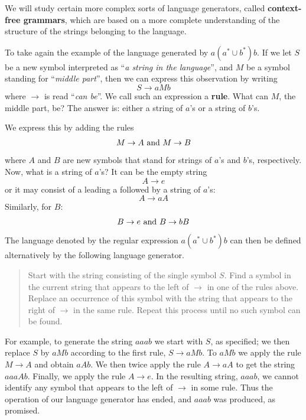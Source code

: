 \begin{multicols*}{2}
We will study certain more complex sorts of language generators, called \textbf{context-free grammars}, which are based on a more complete understanding of the structure of the strings belonging to the language.


To take again the example of the language generated by $a(a^* \cup b^*)b$. If we let $S$ be a new symbol interpreted as ``\textit{a string in the language}'', and $M$ be a symbol standing for ``\textit{middle part}'', then we can express this observation by writing
\begin{equation*}
  S \to aMb
\end{equation*}
where $\to$ is read ``\textit{can be}''. We call such an expression a \textbf{rule}. What can $M$, the middle part, be? The answer is: either a string of $a$'s or a string of $b$'s.

\vspace*{\fill}
\columnbreak

\noindent We express this by adding the rules
\begin{align*}
  M \to A \textnormal{    and    } M \to B
\end{align*}
where $A$ and $B$ are new symbols that stand for strings of $a$'s and $b$'s, respectively. Now, what is a string of $a$'s? It can be the empty string
\begin{equation*}
  A \to e
\end{equation*}
or it may consist of a leading a followed by a string of $a$'s:
\begin{equation*}
  A \to aA
\end{equation*}
Similarly, for $B$:
\begin{equation*}
  B \to e \textnormal{    and    } B \to bB
\end{equation*}
The language denoted by the regular expression $a(a^* \cup b^*)b$ can then be defined alternatively by the following language generator.
\begin{quote}
  Start with the string consisting of the single symbol $S$. Find a symbol in the current string that appears to the left of $\to$ in one of the rules above. Replace an occurrence of this symbol with the string that appears to the right of $\to$ in the same rule. Repeat this process until no such symbol can be found.
\end{quote}

For example, to generate the string $aaab$ we start with $S$, as specified; we then replace $S$ by $aMb$ according to the first rule, $S \to aMb$. To $aMb$ we apply the rule $M \to A$ and obtain $aAb$. We then twice apply the rule $A \to aA$ to get the string $aaaAb$. Finally, we apply the rule $A \to e$. In the resulting string, $aaab$, we cannot identify any symbol that appears to the left of $\to$ in some rule. Thus the operation of our language generator has ended, and $aaab$ was produced, as promised.


\end{multicols*}

